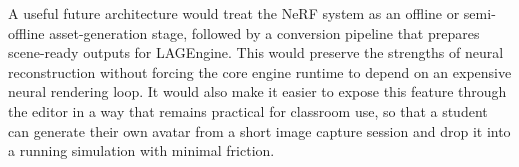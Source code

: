 \documentclass[9pt,openany]{extbook}
\begin{document}
A useful future architecture would treat the NeRF system as an offline or semi-offline asset-generation stage, followed by a conversion pipeline that prepares scene-ready outputs for LAGEngine. This would preserve the strengths of neural reconstruction without forcing the core engine runtime to depend on an expensive neural rendering loop. It would also make it easier to expose this feature through the editor in a way that remains practical for classroom use, so that a student can generate their own avatar from a short image capture session and drop it into a running simulation with minimal friction.

{\footnotesize


}
\end{document}
